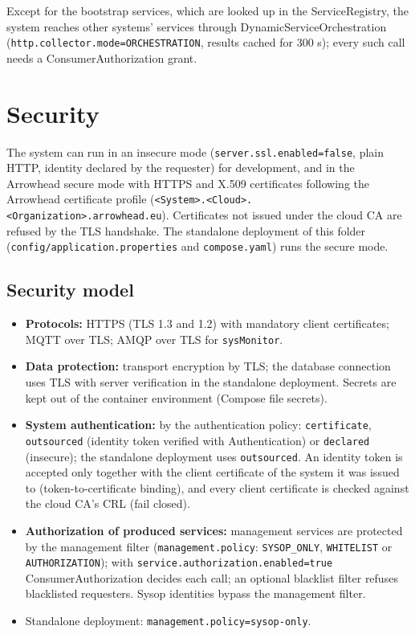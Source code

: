 \documentclass[a4paper]{arrowhead}
\begin{document}
Except for the bootstrap services, which are looked up in the ServiceRegistry, the system reaches other systems' services through DynamicServiceOrchestration (\texttt{http.collector.mode=ORCHESTRATION}, results cached for 300 s); every such call needs a ConsumerAuthorization grant.

\newpage

\section{Security}
\label{sec:security}

The system can run in an insecure mode (\texttt{server.ssl.enabled=false}, plain HTTP, identity declared by the requester) for development, and in the Arrowhead secure mode with HTTPS and X.509 certificates following the Arrowhead certificate profile (\texttt{<System>.<Cloud>.<Organization>.arrowhead.eu}). Certificates not issued under the cloud CA are refused by the TLS handshake. The standalone deployment of this folder (\texttt{config/\allowbreak{}application.\allowbreak{}properties} and \texttt{compose.yaml}) runs the secure mode.

\subsection{Security model}


\begin{itemize}
  \item \textbf{Protocols:} HTTPS (TLS 1.3 and 1.2) with mandatory client certificates; MQTT over TLS; AMQP over TLS for \texttt{sysMonitor}.
  \item \textbf{Data protection:} transport encryption by TLS; the database connection uses TLS with server verification in the standalone deployment. Secrets are kept out of the container environment (Compose file secrets).
  \item \textbf{System authentication:} by the authentication policy: \texttt{certificate}, \texttt{outsourced} (identity token verified with Authentication) or \texttt{declared} (insecure); the standalone deployment uses \texttt{outsourced}. An identity token is accepted only together with the client certificate of the system it was issued to (token-to-certificate binding), and every client certificate is checked against the cloud CA's CRL (fail closed).
  \item \textbf{Authorization of produced services:} management services are protected by the management filter (\texttt{management.policy}: \texttt{SYSOP\_ONLY}, \texttt{WHITELIST} or \texttt{AUTHORIZATION}); with \texttt{service.authorization.enabled=true} ConsumerAuthorization decides each call; an optional blacklist filter refuses blacklisted requesters. Sysop identities bypass the management filter.
  \item Standalone deployment: \texttt{management.\allowbreak{}policy=\allowbreak{}sysop-\allowbreak{}only}.
\end{itemize}
\end{document}
